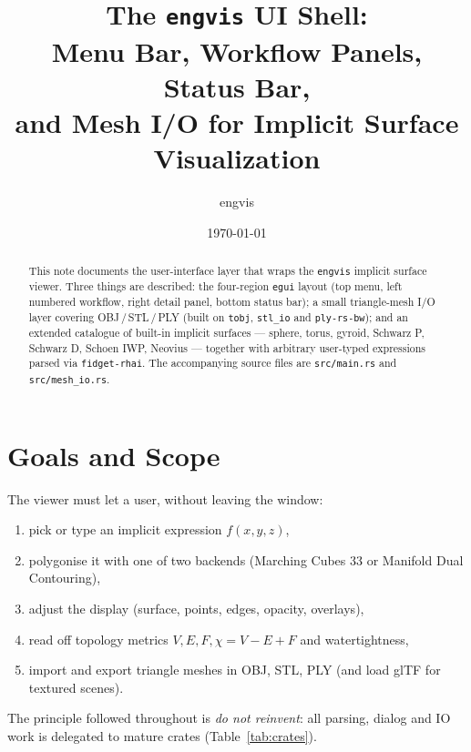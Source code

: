 \documentclass[11pt]{article}
\title{The \texttt{engvis} UI Shell:\\
       Menu Bar, Workflow Panels, Status Bar,\\
       and Mesh I/O for Implicit Surface Visualization}
\author{engvis}
\date{\today}
\begin{document}
\maketitle

\begin{abstract}
This note documents the user-interface layer that wraps the
\texttt{engvis} implicit surface viewer.  Three things are described:
the four-region \texttt{egui} layout (top menu, left numbered workflow,
right detail panel, bottom status bar); a small triangle-mesh I/O layer
covering OBJ\,/\,STL\,/\,PLY (built on \texttt{tobj}, \texttt{stl\_io}
and \texttt{ply-rs-bw}); and an extended catalogue of built-in implicit
surfaces --- sphere, torus, gyroid, Schwarz P, Schwarz D, Schoen IWP,
Neovius --- together with arbitrary user-typed expressions parsed via
\texttt{fidget-rhai}.  The accompanying source files are
\texttt{src/main.rs} and \texttt{src/mesh\_io.rs}.
\end{abstract}

\section{Goals and Scope}

The viewer must let a user, without leaving the window:
\begin{enumerate}[leftmargin=2em]
  \item pick or type an implicit expression $f(x,y,z)$,
  \item polygonise it with one of two backends
        (Marching Cubes 33 or Manifold Dual Contouring),
  \item adjust the display (surface, points, edges, opacity, overlays),
  \item read off topology metrics
        $V,E,F,\chi=V-E+F$ and watertightness,
  \item import and export triangle meshes in OBJ, STL, PLY
        (and load glTF for textured scenes).
\end{enumerate}

The principle followed throughout is \emph{do not reinvent}:
all parsing, dialog and IO work is delegated to mature crates
(Table~\ref{tab:crates}).
\end{document}
